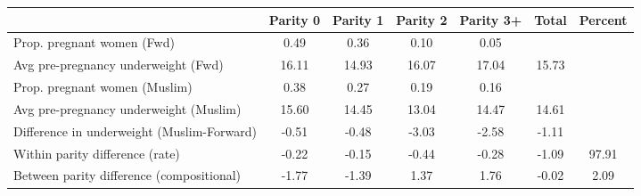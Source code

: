 \begin{tabular}{l*{6}{c}}
\toprule
            &\multicolumn{1}{c}{Parity 0}&\multicolumn{1}{c}{Parity 1}&\multicolumn{1}{c}{Parity 2}&\multicolumn{1}{c}{Parity 3+}&\multicolumn{1}{c}{Total}&\multicolumn{1}{c}{Percent}\\
\midrule
\midrule
Prop. pregnant women (Fwd)&        0.49&        0.36&        0.10&        0.05&            &            \\
Avg pre-pregnancy underweight (Fwd)&       16.11&       14.93&       16.07&       17.04&       15.73&            \\
Prop. pregnant women (Muslim)&        0.38&        0.27&        0.19&        0.16&            &            \\
Avg pre-pregnancy underweight (Muslim)&       15.60&       14.45&       13.04&       14.47&       14.61&            \\
Difference in underweight (Muslim-Forward)&       -0.51&       -0.48&       -3.03&       -2.58&       -1.11&            \\
Within parity difference (rate)&       -0.22&       -0.15&       -0.44&       -0.28&       -1.09&       97.91\\
Between parity difference (compositional)&       -1.77&       -1.39&        1.37&        1.76&       -0.02&        2.09\\
\bottomrule
\end{tabular}
